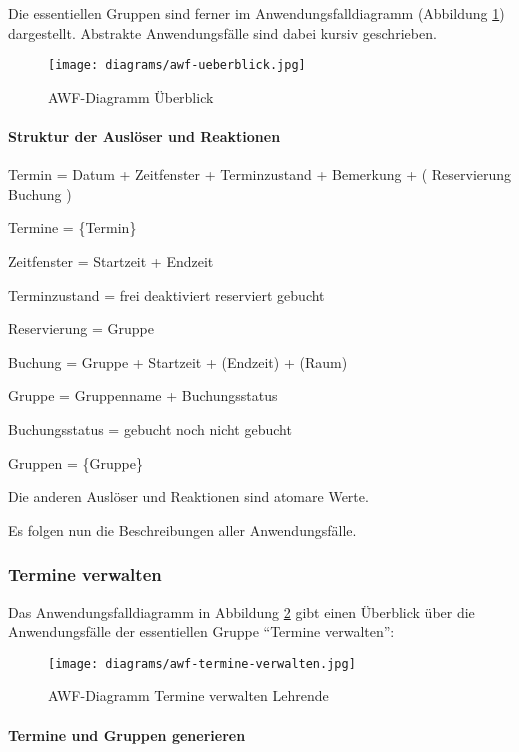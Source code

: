 Die essentiellen Gruppen sind ferner im Anwendungsfalldiagramm (Abbildung \ref{fig:awf-ueberblick}) dargestellt. Abstrakte Anwendungsfälle sind dabei kursiv geschrieben.

\begin{figure}
  \centering
  \texttt{[image: diagrams/awf-ueberblick.jpg]}
  \caption{AWF-Diagramm Überblick}
  \label{fig:awf-ueberblick}
\end{figure}

\paragraph{Struktur der Auslöser und Reaktionen}

Termin = Datum + Zeitfenster + Terminzustand + Bemerkung + (
Reservierung \textbar{} Buchung )

Termine = \{Termin\}

Zeitfenster = Startzeit + Endzeit

Terminzustand = frei \textbar{} deaktiviert \textbar{} reserviert \textbar{} gebucht

Reservierung = Gruppe

Buchung = Gruppe + Startzeit + (Endzeit) + (Raum)

Gruppe = Gruppenname + Buchungsstatus

Buchungsstatus = gebucht \textbar{} noch nicht gebucht

Gruppen = \{Gruppe\}

Die anderen Auslöser und Reaktionen sind atomare Werte.

Es folgen nun die Beschreibungen aller Anwendungsfälle.

\subsubsection{Termine verwalten}
Das Anwendungsfalldiagramm in Abbildung \ref{fig:awf-termine-verwalten} gibt einen Überblick über die Anwendungsfälle der essentiellen Gruppe ``Termine verwalten'':

\begin{figure}
  \centering
  \texttt{[image: diagrams/awf-termine-verwalten.jpg]}
  \caption{AWF-Diagramm Termine verwalten Lehrende}
  \label{fig:awf-termine-verwalten}
\end{figure}

\paragraph{Termine und Gruppen generieren}

